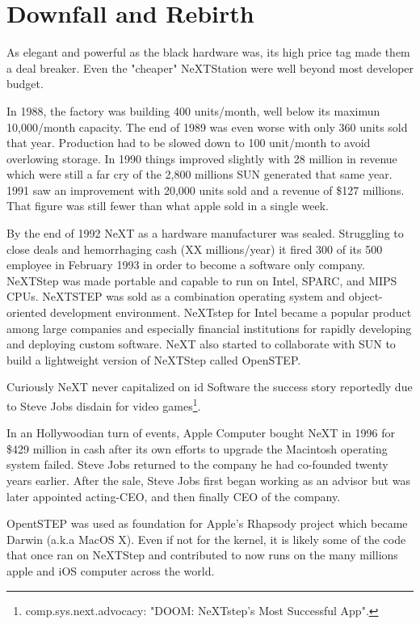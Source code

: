 \section{Downfall and Rebirth}
As elegant and powerful as the black hardware was, its high price tag made them a deal breaker. Even the "cheaper" NeXTStation were well beyond most developer budget.\\
\par
 In 1988, the factory was building 400 units/month, well below its maximun 10,000/month capacity. The end of 1989 was even worse with only 360 units sold that year. Production had to be slowed down to 100 unit/month to avoid overlowing storage. In 1990 things improved slightly with 28 million in revenue which were still a far cry of the 2,800 millions SUN generated that same year. 1991 saw an improvement with 20,000 units sold and a revenue of \$127 millions. That figure was still fewer than what apple sold in a single week.\\
\par
By the end of 1992 NeXT as a hardware manufacturer was sealed. Struggling to close deals and hemorrhaging cash (XX millions/year) it fired 300 of its 500 employee in February 1993 in order to become a software only company. NeXTStep was made portable and capable to run on Intel, SPARC, and MIPS CPUs. NeXTSTEP was sold as a combination operating system and object-oriented development environment. NeXTstep for Intel became a popular product among large companies and especially financial institutions for rapidly developing and deploying custom software. NeXT also started to collaborate with SUN to build a lightweight version of NeXTStep called OpenSTEP.\\
\par
Curiously NeXT never capitalized on id Software the success story reportedly due to Steve Jobs disdain for video games\footnote{comp.sys.next.advocacy: "DOOM: NeXTstep's Most Successful App".}.\\
\par
In an Hollywoodian turn of events, Apple Computer bought NeXT in 1996 for \$429 million in cash after its own efforts to upgrade the Macintosh operating system failed.  Steve Jobs returned to the company he had co-founded twenty years earlier. After the sale, Steve Jobs first began working as an advisor but was later appointed acting-CEO, and then finally CEO of the company.\\
\par
OpentSTEP was used as foundation for Apple's Rhapsody project which became Darwin (a.k.a MacOS X). Even if not for the kernel, it is likely some of the code that once ran on NeXTStep and contributed to \doom now runs on the many millions apple and iOS computer across the world.\\



